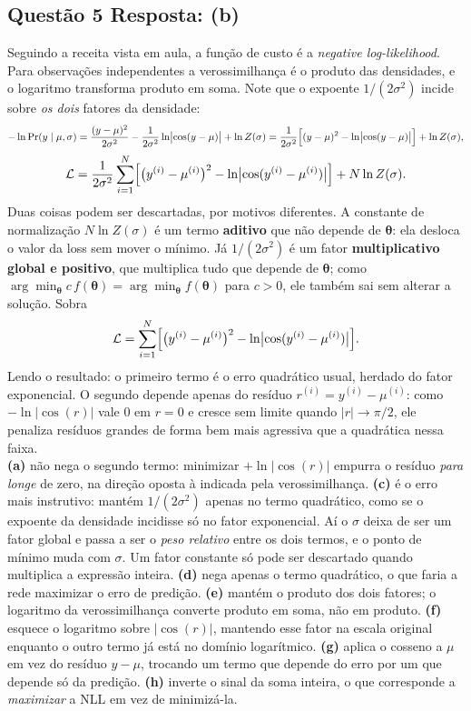 \documentclass[11pt,a4paper]{article}
\begin{document}
\subsection*{Questão 5 \textemdash{} Resposta: (b)}
Seguindo a receita vista em aula, a função de custo é a \textit{negative log-likelihood}. Para observações independentes a verossimilhança é o produto das densidades, e o logaritmo transforma produto em soma. Note que o expoente $1/(2\sigma^2)$ incide sobre \emph{os dois} fatores da densidade:
\[
-\ln \Pr(y \mid \mu, \sigma)
 = \frac{(y - \mu)^2}{2\sigma^2} - \frac{1}{2\sigma^2}\ln\bigl|\cos(y - \mu)\bigr| + \ln Z(\sigma)
 = \frac{1}{2\sigma^2}\Bigl[ (y - \mu)^2 - \ln\bigl|\cos(y - \mu)\bigr| \Bigr] + \ln Z(\sigma),
\]
\[
\mathcal{L} = \frac{1}{2\sigma^2}\sum_{i=1}^{N} \Bigl[ \bigl(y^{(i)} - \mu^{(i)}\bigr)^2 - \ln\bigl|\cos(y^{(i)} - \mu^{(i)})\bigr| \Bigr] + N\ln Z(\sigma).
\]
Duas coisas podem ser descartadas, por motivos diferentes. A constante de normalização $N \ln Z(\sigma)$ é um termo \textbf{aditivo} que não depende de $\boldsymbol{\theta}$: ela desloca o valor da loss sem mover o mínimo. Já $1/(2\sigma^2)$ é um fator \textbf{multiplicativo global e positivo}, que multiplica tudo que depende de $\boldsymbol{\theta}$; como $\arg\min_{\boldsymbol{\theta}} c\,f(\boldsymbol{\theta}) = \arg\min_{\boldsymbol{\theta}} f(\boldsymbol{\theta})$ para $c > 0$, ele também sai sem alterar a solução. Sobra
\[
\mathcal{L} = \sum_{i=1}^{N} \Bigl[ \bigl(y^{(i)} - \mu^{(i)}\bigr)^2 - \ln\bigl|\cos(y^{(i)} - \mu^{(i)})\bigr| \Bigr].
\]
Lendo o resultado: o primeiro termo é o erro quadrático usual, herdado do fator exponencial. O segundo depende apenas do resíduo $r^{(i)} = y^{(i)} - \mu^{(i)}$: como $-\ln|\cos(r)|$ vale $0$ em $r = 0$ e cresce sem limite quando $|r| \to \pi/2$, ele penaliza resíduos grandes de forma bem mais agressiva que a quadrática nessa faixa.\\
\textbf{(a)} não nega o segundo termo: minimizar $+\ln|\cos(r)|$ empurra o resíduo \emph{para longe} de zero, na direção oposta à indicada pela verossimilhança.
\textbf{(c)} é o erro mais instrutivo: mantém $1/(2\sigma^2)$ apenas no termo quadrático, como se o expoente da densidade incidisse só no fator exponencial. Aí o $\sigma$ deixa de ser um fator global e passa a ser o \emph{peso relativo} entre os dois termos, e o ponto de mínimo muda com $\sigma$. Um fator constante só pode ser descartado quando multiplica a expressão inteira.
\textbf{(d)} nega apenas o termo quadrático, o que faria a rede maximizar o erro de predição.
\textbf{(e)} mantém o produto dos dois fatores; o logaritmo da verossimilhança converte produto em soma, não em produto.
\textbf{(f)} esquece o logaritmo sobre $|\cos(r)|$, mantendo esse fator na escala original enquanto o outro termo já está no domínio logarítmico.
\textbf{(g)} aplica o cosseno a $\mu$ em vez do resíduo $y - \mu$, trocando um termo que depende do erro por um que depende só da predição.
\textbf{(h)} inverte o sinal da soma inteira, o que corresponde a \emph{maximizar} a NLL em vez de minimizá-la.
\end{document}
